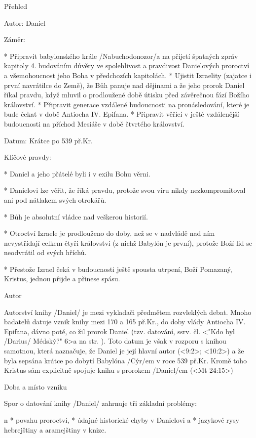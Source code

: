 Přehled

Autor: Daniel

Záměr:

\begitems
* Připravit babylonského krále \x/Nabuchodonozor/a na přijetí špatných zpráv kapitoly 4. budováním důvěry ve spolehlivost a pravdivost Danielových proroctví a všemohoucnost jeho Boha v předchozích kapitolách. 
* Ujistit Izraelity (zajatce i první navrátilce do Země), že Bůh panuje nad dějinami a že jeho prorok Daniel říkal pravdu, když mluvil o prodloužené době útisku před závěrečnou fází Božího království. 
* Připravit generace vzdálené budoucnosti na pronásledování, které je bude čekat v době Antiocha IV. Epifana.
* Připravit věřící v ještě vzdálenější budoucnosti na příchod Mesiáše v době čtvrtého království.
\enditems 


Datum: Krátce po 539 př.Kr.

Klíčové pravdy:

\begitems
* Daniel a jeho přátelé byli i v exilu Bohu věrni.

* Danielovi lze věřit, že říká pravdu, protože svou víru nikdy nezkompromitoval ani pod nátlakem svých otrokářů.

* Bůh je absolutní vládce nad veškerou historií.

* Otroctví Izraele je prodlouženo do doby, než se v nadvládě nad ním nevystřídají celkem čtyři  království (z nichž Babylón je první), protože Boží lid se neodvrátil od svých hříchů. 

* Přestože Izrael čeká v budoucnosti ještě spousta utrpení, Boží Pomazaný, Kristus, jednou přijde a přinese spásu.

\enditems

Autor

Autorství knihy \x/Daniel/ je mezi vykladači předmětem rozvleklých debat.
Mnoho badatelů datuje vznik knihy mezi 170 a 165 př.Kr., do doby vlády Antiocha IV. Epifana, dávno poté, co žil prorok Daniel (tzv.  datování, ssrv. čl. <"Kdo byl \x/Darius/ Médský?" 6>a na str. \pg). 
Toto datum je však v rozporu s knihou samotnou, která naznačuje, že Daniel je její hlavní autor (<9:2>; <10:2>) a že byla sepsána krátce po dobytí Babylóna \x/Cýr/em v roce 539 př.Kr. Kromě toho  Kristus sám explicitně spojuje knihu s prorokem \x/Daniel/em (<Mt 24:15>) 

Doba a místo vzniku

Spor o datování knihy \x/Daniel/ zahrnuje tři základní problémy:

\begitems \style n
* povahu proroctví,
* údajné historické chyby v Danielovi a 
* jazykové rysy hebrejštiny a aramejštiny v knize.
\enditems

